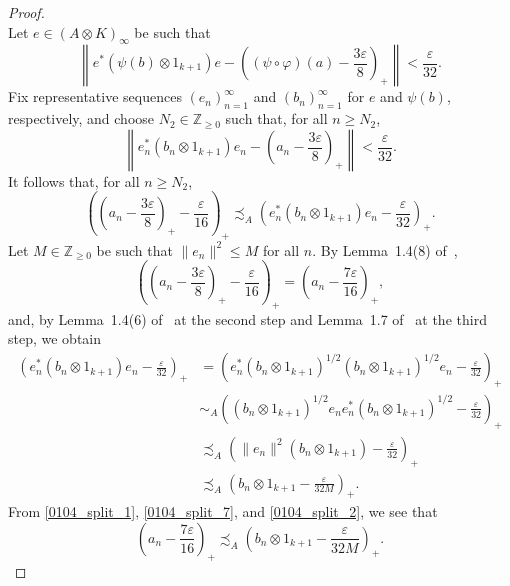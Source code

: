 \documentclass[10pt]{amsart}
\numberwithin{equation}{section}
\theoremstyle{definition}
\newcommand{\ep}{\varepsilon}
\newcommand{\ph}{\varphi}
\newcommand{\ps}{\psi}
\newcommand{\Nz}{{\mathbb{Z}}_{\geq 0}}
\begin{document}
\begin{proof}
\begin{equation*}
\end{equation*}
Let $e \in (A \otimes K)_\infty$ be such that
\begin{equation*}
\left\|e^* \left(\ps (b) \otimes 1_{k+1}\right) e - \left((\ps \circ \ph)(a)- \frac{3\ep}{8}\right)_+\right\| < \frac{ \ep}{32}.
\end{equation*}
Fix representative sequences $(e_n)_{n=1}^\infty$ and $(b_n)_{n=1}^\infty$ for $e$ and $\psi(b)$, respectively, and choose $N_2 \in \Nz$ such that, for all $n \geq N_2$,
\begin{equation*}
\left\| e_n^* (b_n \otimes 1_{k+1} ) e_n - \left( a_n - \frac{3\ep}{8}\right)_+\right\| < \frac{\ep}{32}.
\end{equation*}
It follows that, for all $n \geq N_2$,
\begin{equation}\label{0104_split_1}
\left( \left(a_n -\frac{3\ep}{8}\right)_+ - \frac{\ep}{16} \right)_+ \precsim_A \left(e_n^* (b_n \otimes 1_{k+1}) e_n -\frac{\ep}{32}\right)_+.
\end{equation}
Let $M\in \Nz$ be such that $\|e_n\|^2 \leq M$ for all $n$. By
Lemma~1.4(8) of~\cite{Phl40},
\begin{equation}\label{0104_split_7}
\left(\left(a_n -\frac{3\ep}{8}\right)_+ - \frac{\ep}{16}\right)_+=  \left(a_n - \frac{7\ep}{16}\right)_+,
\end{equation}
and, by Lemma~1.4(6) of~\cite{Phl40} at the second step and
Lemma~1.7 of~\cite{Phl40} at the third step, we obtain
\begin{equation}\label{0104_split_2}
\begin{split}
\left(e_n^*(b_n \otimes 1_{k+1}) e_n -\frac{\ep}{32}\right)_+ & =
\left(e_n^* (b_n \otimes 1_{k+1})^{1/2} (b_n \otimes 1_{k+1})^{1/2} e_n -\frac{\ep}{32}\right)_+ \\
& \sim_A \left((b_n \otimes 1_{k+1})^{1/2} e_n e_n^* (b_n \otimes 1_{k+1})^{1/2} - \frac{\ep}{32}\right)_+\\
&\precsim_A \left(\|e_n\|^2 (b_n \otimes 1_{k+1}) -\frac{\ep}{32}\right)_+\\
& \precsim_A \left(b_n \otimes 1_{k+1}- \frac{\ep}{32 M}\right)_+.
\end{split}
\end{equation}
From \eqref{0104_split_1}, \eqref{0104_split_7}, and \eqref{0104_split_2}, we see that
\begin{equation}\label{0104_split_div_second}
\left(a_n - \frac{7\ep}{16}\right)_+ \precsim_A \left(b_n \otimes 1_{k+1} - \frac{\ep}{32 M}\right)_+.
\end{equation}

\end{proof}
\end{document}
